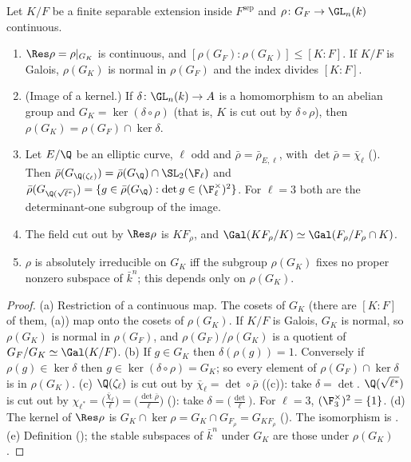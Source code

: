\begin{proposition}\label{prop:galois:restriction}
Let $K/F$ be a finite separable extension inside $F^{\mathrm{sep}}$ and $\rho\colon G_F\to\GL_n(k)$ continuous.
\begin{enumerate}[label=(\alph*)]
\item $\Res\rho=\rho|_{G_K}$ is continuous, and $[\rho(G_F):\rho(G_K)]\le[K:F]$. If $K/F$ is Galois, $\rho(G_K)$ is normal in $\rho(G_F)$ and the index divides $[K:F]$.
\item (Image of a kernel.) If $\delta\colon\GL_n(k)\to A$ is a homomorphism to an abelian group and $G_K=\ker(\delta\circ\rho)$ (that is, $K$ is cut out by $\delta\circ\rho$),
then $\rho(G_K)=\rho(G_F)\cap\ker\delta$.
\item Let $E/\Q$ be an elliptic curve, $\ell$ odd and $\bar\rho=\bar\rho_{E,\ell}$, with $\det\bar\rho=\bar\chi_\ell$ (). Then
$\bar\rho(G_{\Q(\zeta_\ell)})=\bar\rho(G_\Q)\cap\SL_2(\F_\ell)$ and $\bar\rho(G_{\Q(\sqrt{\ell^*})})=\{g\in\bar\rho(G_\Q):\det g\in(\F_\ell^\times)^2\}$. For $\ell=3$ both are the
determinant-one subgroup of the image.
\item The field cut out by $\Res\rho$ is $KF_\rho$, and $\Gal(KF_\rho/K)\simeq\Gal(F_\rho/F_\rho\cap K)$.
\item $\rho$ is absolutely irreducible on $G_K$ iff the subgroup $\rho(G_K)$ fixes no proper nonzero subspace of $\bar k^n$; this depends only on $\rho(G_K)$.
\end{enumerate}
\end{proposition}

\begin{proof}
(a) Restriction of a continuous map. The cosets of $G_K$ (there are $[K:F]$ of them, (a)) map onto the cosets of $\rho(G_K)$. If $K/F$ is Galois,
$G_K$ is normal, so $\rho(G_K)$ is normal in $\rho(G_F)$, and $\rho(G_F)/\rho(G_K)$ is a quotient of $G_F/G_K\simeq\Gal(K/F)$.
(b) If $g\in G_K$ then $\delta(\rho(g))=1$. Conversely if $\rho(g)\in\ker\delta$ then $g\in\ker(\delta\circ\rho)=G_K$; so every element of $\rho(G_F)\cap\ker\delta$ is in
$\rho(G_K)$.
(c) $\Q(\zeta_\ell)$ is cut out by $\bar\chi_\ell=\det\circ\bar\rho$ ((c)): take $\delta=\det$. $\Q(\sqrt{\ell^*})$ is cut out by
$\chi_{\ell^*}=\bigl(\frac{\bar\chi_\ell}{\ell}\bigr)=\bigl(\frac{\det\bar\rho}{\ell}\bigr)$ (): take $\delta=\bigl(\frac{\det}{\ell}\bigr)$. For
$\ell=3$, $(\F_3^\times)^2=\{1\}$.
(d) The kernel of $\Res\rho$ is $G_K\cap\ker\rho=G_K\cap G_{F_\rho}=G_{KF_\rho}$ (). The isomorphism is .
(e) Definition (); the stable subspaces of $\bar k^n$ under $G_K$ are those under $\rho(G_K)$.
\end{proof}

